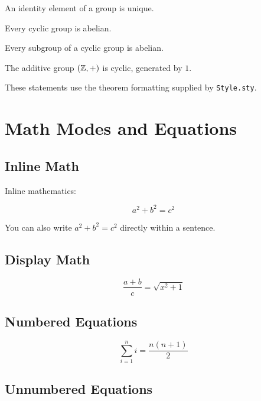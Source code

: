 \documentclass{article}
\begin{document}
\begin{lemma}
    An identity element of a group is unique.
\end{lemma}

\begin{proposition}
    Every cyclic group is abelian.
\end{proposition}

\begin{corollary}
    Every subgroup of a cyclic group is abelian.
\end{corollary}

\begin{example}
    The additive group $(\mathbb{Z},+)$ is cyclic,
    generated by $1$.
\end{example}

\begin{remark}
    These statements use the theorem formatting
    supplied by \texttt{Style.sty}.
\end{remark}


\section{Math Modes and Equations}

\subsection{Inline Math}

Inline mathematics:

\[
    a^2+b^2=c^2
\]

You can also write $a^2+b^2=c^2$ directly
within a sentence.

\subsection{Display Math}

\[
    \frac{a+b}{c}=\sqrt{x^2+1}
\]

\subsection{Numbered Equations}

\begin{equation}
    \sum_{i=1}^{n}i=\frac{n(n+1)}{2}
    \label{eq:sample}
\end{equation}

\subsection{Unnumbered Equations}
\end{document}

